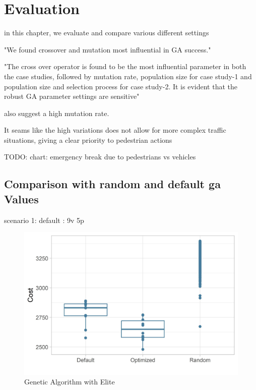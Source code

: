 \chapter{Evaluation}
\label{chap:evaluation}
in this chapter, we evaluate and compare various different settings

"We found crossover and mutation most influential in GA success."\cite{mills_determining_2015}

"The cross over operator is found to be the most influential parameter in both the case studies, followed by mutation rate, population size for case study-1 and population size and selection process for case study-2. It is evident that the robust GA parameter settings are sensitive"\cite{majumdar_genetic_2015}

\cite{boyabatli_parameter_2004} also suggest a high mutation rate.



It seams like the high variations does not allow for more complex traffic situations, giving a clear priority to pedestrian actions

TODO: chart: emergency break due to pedestrians vs vehicles

\section{Comparison with random and default ga Values}
scenario 1: default : 9v 5p

\begin{figure}[ht] 
	\label{figure:sim_1_comparison}
	\includegraphics[width=1\linewidth]{simulations/evaluation/plots/sim_1_comparison}
	\caption{Genetic Algorithm with Elite}
\end{figure}

